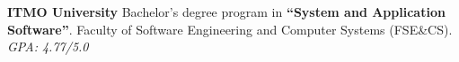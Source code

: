 
\vspace{0.8em}
\begin{scholarship}
     {\textbf{ITMO University} \newline
     Bachelor's degree program in \textbf{``System and Application Software''}. \newline
     Faculty of Software Engineering and Computer Systems (FSE\&CS). \newline
     {}\enspace\textperiodcentered\enspace \textit{GPA: 4.77/5.0}}
\end{scholarship}

